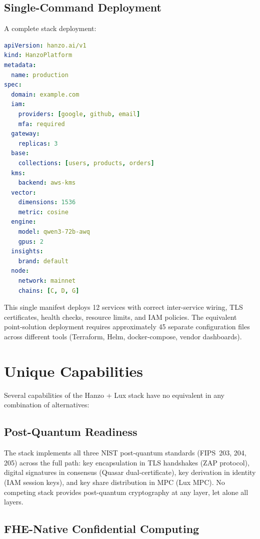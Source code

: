 \documentclass[11pt,twocolumn]{article}
\begin{document}
\subsection{Single-Command Deployment}

A complete stack deployment:

\begin{lstlisting}[language=YAML,caption={Minimal Hanzo stack deployment.}]
apiVersion: hanzo.ai/v1
kind: HanzoPlatform
metadata:
  name: production
spec:
  domain: example.com
  iam:
    providers: [google, github, email]
    mfa: required
  gateway:
    replicas: 3
  base:
    collections: [users, products, orders]
  kms:
    backend: aws-kms
  vector:
    dimensions: 1536
    metric: cosine
  engine:
    model: qwen3-72b-awq
    gpus: 2
  insights:
    brand: default
  node:
    network: mainnet
    chains: [C, D, G]
\end{lstlisting}

This single manifest deploys 12 services with correct inter-service wiring, TLS certificates, health checks, resource limits, and IAM policies. The equivalent point-solution deployment requires approximately 45 separate configuration files across different tools (Terraform, Helm, docker-compose, vendor dashboards).

\section{Unique Capabilities}
\label{sec:unique}

Several capabilities of the Hanzo + Lux stack have no equivalent in any combination of alternatives:

\subsection{Post-Quantum Readiness}

The stack implements all three NIST post-quantum standards (FIPS~203, 204, 205) across the full path: key encapsulation in TLS handshakes (ZAP protocol), digital signatures in consensus (Quasar dual-certificate), key derivation in identity (IAM session keys), and key share distribution in MPC (Lux MPC). No competing stack provides post-quantum cryptography at any layer, let alone all layers.

\subsection{FHE-Native Confidential Computing}
\end{document}
